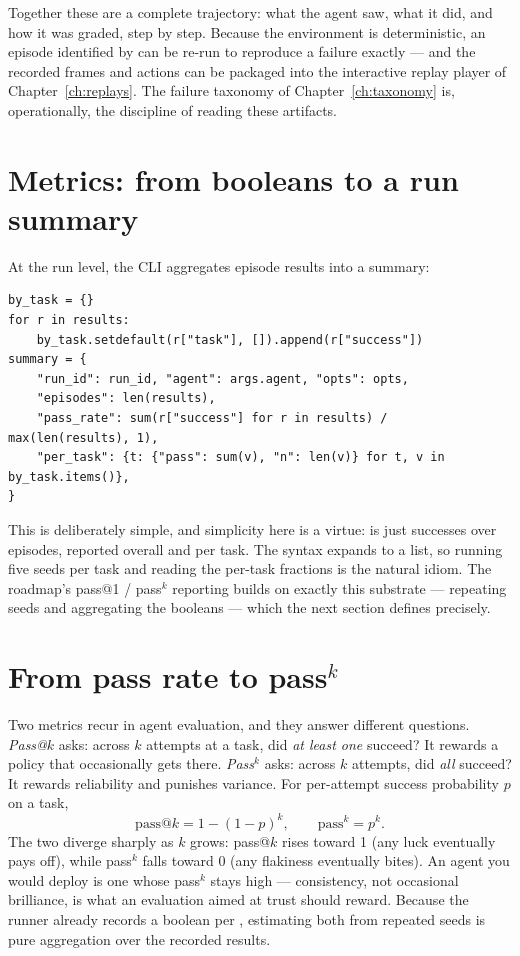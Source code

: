 \documentclass[11pt,openany]{book}
\newcommand{\code}[1]{\textcolor{clayd}{\texttt{\detokenize{#1}}}}
\begin{document}
Together these are a complete trajectory: what the agent saw, what it did, and how
it was graded, step by step. Because the environment is deterministic, an episode
identified by \code{(task, seed, opts)} can be re-run to reproduce a failure
exactly — and the recorded frames and actions can be packaged into the interactive
replay player of Chapter~\ref{ch:replays}. The failure taxonomy of
Chapter~\ref{ch:taxonomy} is, operationally, the discipline of reading these
artifacts.

\section{Metrics: from booleans to a run summary}

At the run level, the CLI aggregates episode results into a summary:

\begin{lstlisting}[style=py]
by_task = {}
for r in results:
    by_task.setdefault(r["task"], []).append(r["success"])
summary = {
    "run_id": run_id, "agent": args.agent, "opts": opts,
    "episodes": len(results),
    "pass_rate": sum(r["success"] for r in results) / max(len(results), 1),
    "per_task": {t: {"pass": sum(v), "n": len(v)} for t, v in by_task.items()},
}
\end{lstlisting}

This is deliberately simple, and simplicity here is a virtue: \code{pass_rate} is
just successes over episodes, reported overall and per task. The \code{--seeds
0-4} syntax expands to a list, so running five seeds per task and reading the
per-task fractions is the natural idiom. The roadmap's pass@1 / pass$^k$
reporting builds on exactly this substrate — repeating seeds and aggregating the
booleans — which the next section defines precisely.

\section{From pass rate to \texorpdfstring{pass$^k$}{pass\^k}}

Two metrics recur in agent evaluation, and they answer different questions.
\emph{Pass@$k$} asks: across $k$ attempts at a task, did \emph{at least one}
succeed? It rewards a policy that occasionally gets there. \emph{Pass$^k$} asks:
across $k$ attempts, did \emph{all} succeed? It rewards reliability and punishes
variance. For per-attempt success probability $p$ on a task,
\[
\text{pass@}k = 1-(1-p)^k, \qquad \text{pass}^k = p^k .
\]
The two diverge sharply as $k$ grows: pass@$k$ rises toward 1 (any luck
eventually pays off), while pass$^k$ falls toward 0 (any flakiness eventually
bites). An agent you would deploy is one whose pass$^k$ stays high — consistency,
not occasional brilliance, is what an evaluation aimed at trust should reward.
Because the runner already records a boolean per \code{(task, seed)}, estimating
both from repeated seeds is pure aggregation over the recorded results.
\end{document}
